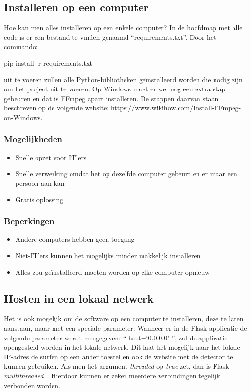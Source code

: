 \subsection{Installeren op een computer}
Hoe kan men alles installeren op een enkele computer?
In de hoofdmap met alle code is er een bestand te vinden genaamd ``requirements.txt''. Door het commando:
\begin{python}
    pip install -r requirements.txt
\end{python}
uit te voeren zullen alle Python-bibliotheken geïnstalleerd worden die nodig zijn om het project uit te voeren. Op Windows moet er wel nog een extra stap gebeuren en dat is FFmpeg apart installeren. De stappen daarvan staan beschreven op de volgende website: \url{https://www.wikihow.com/Install-FFmpeg-on-Windows}.

\subsubsection{Mogelijkheden}
\begin{itemize}
    \item Snelle opzet voor IT'ers
    \item Snelle verwerking omdat het op dezelfde computer gebeurt en er maar een persoon aan kan
    \item Gratis oplossing
\end{itemize}
\subsubsection{Beperkingen}
\begin{itemize}
    \item Andere computers hebben geen toegang
    \item Niet-IT'ers kunnen het mogelijks minder makkelijk installeren
    \item Alles zou geïnstalleerd moeten worden op elke computer opnieuw
\end{itemize}

\subsection{Hosten in een lokaal netwerk}
Het is ook mogelijk om de software op een computer te installeren, deze te laten aanstaan, maar met een speciale parameter. Wanneer er in de Flask-applicatie de volgende parameter wordt meegegeven: `` host=`0.0.0.0' '', zal de applicatie opengesteld worden in het lokale netwerk. Dit laat het mogelijk naar het lokale IP-adres de surfen op een ander toestel en ook de website met de detector te kunnen gebruiken. Als men het argument \textit{threaded} op \textit{true} zet, dan is Flask \textit{multithreaded}~\autocite{Vieira2013}. Hierdoor kunnen er zeker meerdere verbindingen tegelijk verbonden worden.

